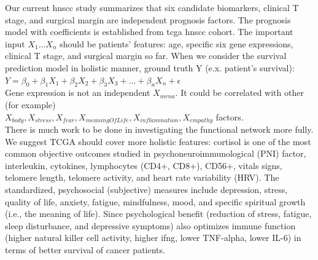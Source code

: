 \documentclass[12pt, a4paper]{article}
\begin{document}
Our current \acrshort{hnscc} study summarizes that six candidate biomarkers, clinical T stage, and surgical margin are independent prognosis factors.
The prognosis model with coefficients is established from \acrshort{tcga} \acrshort{hnscc} cohort. The important input $X_1...X_n$ should be patients' features: age, specific six gene expressions, clinical T stage, and surgical margin so far.
When we consider the survival prediction model in holistic manner,
ground truth Y (e.x. patient's survival):\\[0.5cm]
$Y = \beta_0 + \beta_1 X_1 + \beta_2 X_2 + \beta_3 X_3 + ... + \beta_n X_n + \epsilon$\\[0.5cm]
Gene expression is not an independent $X_{mrna}$. It could be correlated with other (for example)\\ $X_{body}, X_{stress}, X_{fear}, X_{meaningOfLife}, X_{inflammation}, X_{empathy}$ factors.\\
There is much work to be done in investigating the functional network more fully\citep{Rogers1959}.
We suggest TCGA should cover more holistic features:
cortisol is one of the most common objective outcomes studied in psychoneuroimmunological (PNI) factor, interleukin, cytokines, lymphocytes (CD4+, CD8+), CD56+, vitals signs, telomere length, telomere activity, and heart rate variability (HRV).
The standardized, psychosocial (subjective) measures include depression, stress, quality of life, anxiety, fatigue, mindfulness, mood, and specific spiritual growth (i.e., the meaning of life)\citep{Hsiao2012}.
Since psychological benefit (reduction of stress, fatigue, sleep disturbance, and depressive symptoms) also optimizes immune function (higher natural killer cell activity, higher \acrshort{ifng}, lower TNF-alpha, lower IL-6) in terms of better survival of cancer patients.
\end{document}
